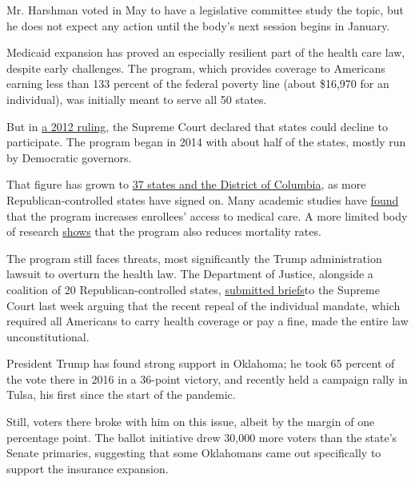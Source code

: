 Mr. Harshman voted in May to have a legislative committee study the
topic, but he does not expect any action until the body's next session
begins in January.

Medicaid expansion has proved an especially resilient part of the health
care law, despite early challenges. The program, which provides coverage
to Americans earning less than 133 percent of the federal poverty line
(about \$16,970 for an individual), was initially meant to serve all 50
states.

But in
\href{https://www.nytimes3xbfgragh.onion/2012/07/25/health/policy/3-million-more-may-lack-insurance-due-to-ruling-study-says.html}{a
2012 ruling}, the Supreme Court declared that states could decline to
participate. The program began in 2014 with about half of the states,
mostly run by Democratic governors.

That figure has grown to
\href{https://www.kff.org/medicaid/issue-brief/status-of-state-medicaid-expansion-decisions-interactive-map/}{37
states and the District of Columbia}, as more Republican-controlled
states have signed on. Many academic studies have
\href{https://www.kff.org/medicaid/report/the-effects-of-medicaid-expansion-under-the-aca-updated-findings-from-a-literature-review/}{found}
that the program increases enrollees' access to medical care. A more
limited body of research
\href{https://www.nber.org/papers/w26081}{shows} that the program also
reduces mortality rates.

The program still faces threats, most significantly the Trump
administration lawsuit to overturn the health law. The Department of
Justice, alongside a coalition of 20 Republican-controlled states,
\href{https://www.nytimes3xbfgragh.onion/2020/06/26/us/politics/obamacare-trump-administration-supreme-court.html}{submitted
briefs}to the Supreme Court last week arguing that the recent repeal of
the individual mandate, which required all Americans to carry health
coverage or pay a fine, made the entire law unconstitutional.

President Trump has found strong support in Oklahoma; he took 65 percent
of the vote there in 2016 in a 36-point victory, and recently held a
campaign rally in Tulsa, his first since the start of the pandemic.

Still, voters there broke with him on this issue, albeit by the margin
of one percentage point. The ballot initiative drew 30,000 more voters
than the state's Senate primaries, suggesting that some Oklahomans came
out specifically to support the insurance expansion.

